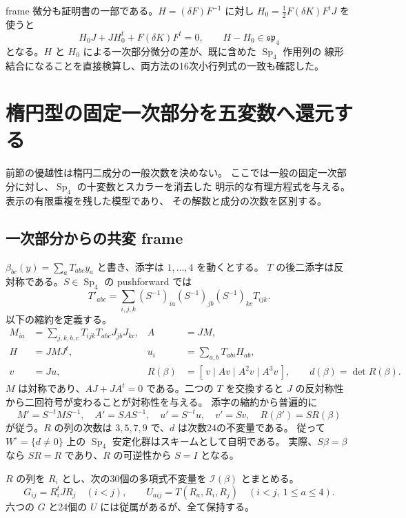 \documentclass[11pt,a4paper]{ltjsarticle}
\DeclareMathOperator{\Sp}{Sp}
\theoremstyle{remark}
\begin{document}
frame 微分も証明書の一部である。$H=(\delta F)F^{-1}$ に対し
$H_0=\frac12F(\delta K)F^tJ$ を使うと
\[
 H_0J+JH_0^t+F(\delta K)F^t=0,\qquad H-H_0\in\mathfrak{sp}_4
\]
となる。$H$ と $H_0$ による一次部分微分の差が、既に含めた $\Sp_4$ 作用列の
線形結合になることを直接検算し、両方法の16次小行列式の一致も確認した。

\section{楕円型の固定一次部分を五変数へ還元する}\label{sec:elliptic-five}
前節の優越性は楕円二成分の一般次数を決めない。
ここでは一般の固定一次部分に対し、$\Sp_4$ の十変数とスカラーを消去した
明示的な有理方程式を与える。表示の有限重複を残した模型であり、
その解数と成分の次数を区別する。

\subsection{一次部分からの共変 frame}
$\beta_{bc}(y)=\sum_aT_{abc}y_a$ と書き、添字は $1,\ldots,4$ を動くとする。
$T$ の後二添字は反対称である。$S\in\Sp_4$ の pushforward では
\[
 T'_{abc}=\sum_{i,j,k}(S^{-1})_{ia}(S^{-1})_{jb}(S^{-1})_{kc}T_{ijk}.
\]
以下の縮約を定義する。
\begin{align}
 M_{ia}&=\sum_{j,k,b,c}T_{ijk}T_{abc}J_{jb}J_{kc},& A&=JM,\nonumber\\
 H&=JMJ^t,&u_i&=\sum_{a,b}T_{abi}H_{ab},\label{eq:covariant-frame}\\
 v&=Ju,&R(\beta)&=[\,v\mid Av\mid A^2v\mid A^3v\,],\qquad
 d(\beta)=\det R(\beta).\nonumber
\end{align}
$M$ は対称であり、$AJ+JA^t=0$ である。二つの $T$ を交換すると
$J$ の反対称性から二回符号が変わることが対称性を与える。
添字の縮約から普遍的に
\[
 M'=S^{-t}MS^{-1},\quad A'=SAS^{-1},\quad u'=S^{-t}u,
 \quad v'=Sv,\quad R(\beta')=SR(\beta)
\]
が従う。$R$ の列の次数は $3,5,7,9$ で、$d$ は次数24の不変量である。
従って $W^\circ=\{d\ne0\}$ 上の $\Sp_4$ 安定化群はスキームとして自明である。
実際、$S\beta=\beta$ なら $SR=R$ であり、$R$ の可逆性から $S=I$ となる。

$R$ の列を $R_i$ とし、次の30個の多項式不変量を $\mathcal I(\beta)$ とまとめる。
\begin{equation}\label{eq:elliptic-signature}
 G_{ij}=R_i^tJR_j\quad(i<j),\qquad
 U_{aij}=T(R_a,R_i,R_j)\quad(i<j,\ 1\le a\le4).
\end{equation}
六つの $G$ と24個の $U$ には従属があるが、全て保持する。
\end{document}
